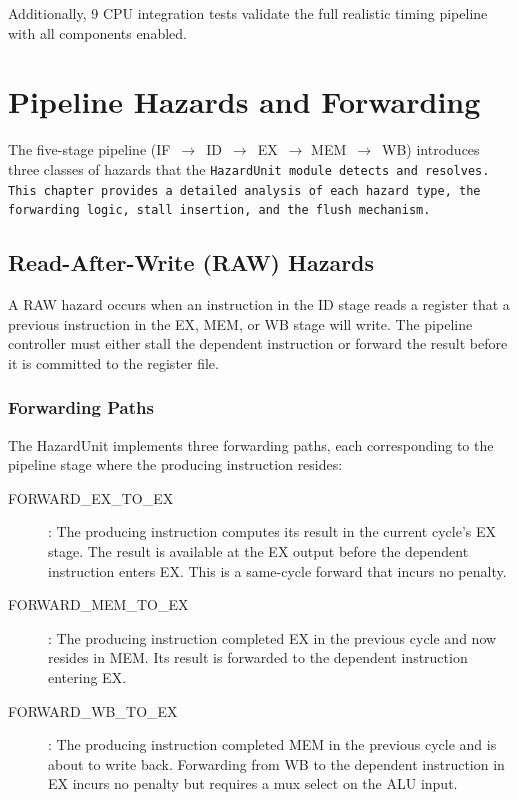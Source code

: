 \documentclass[12pt,a4paper,twoside]{book}
\theoremstyle{trinarytheorem}
\theoremstyle{trinarydefinition}
\newcommand{\code}[1]{\textsf{#1}}
\begin{document}
Additionally, 9 CPU integration tests validate the full realistic timing
pipeline with all components enabled.

\chapter{Pipeline Hazards and Forwarding}
\label{ch:pipeline-hazards}

The five-stage pipeline (IF~$\rightarrow$~ID~$\rightarrow$~EX~$\rightarrow$
MEM~$\rightarrow$~WB) introduces three classes of hazards that the
\tt{HazardUnit} module detects and resolves. This chapter provides a
detailed analysis of each hazard type, the forwarding logic, stall
insertion, and the flush mechanism.

\section{Read-After-Write (RAW) Hazards}

A RAW hazard occurs when an instruction in the ID stage reads a register
that a previous instruction in the EX, MEM, or WB stage will write. The
pipeline controller must either stall the dependent instruction or forward
the result before it is committed to the register file.

\subsection{Forwarding Paths}

The \code{HazardUnit} implements three forwarding paths, each
corresponding to the pipeline stage where the producing instruction
resides:

\begin{description}
    \item[\code{FORWARD\_EX\_TO\_EX}]: The producing instruction
          computes its result in the current cycle's EX stage. The result
          is available at the EX output before the dependent instruction
          enters EX. This is a same-cycle forward that incurs no penalty.
    \item[\code{FORWARD\_MEM\_TO\_EX}]: The producing instruction
          completed EX in the previous cycle and now resides in MEM. Its
          result is forwarded to the dependent instruction entering EX.
    \item[\code{FORWARD\_WB\_TO\_EX}]: The producing instruction
          completed MEM in the previous cycle and is about to write back.
          Forwarding from WB to the dependent instruction in EX incurs
          no penalty but requires a mux select on the ALU input.
\end{description}
\end{document}
